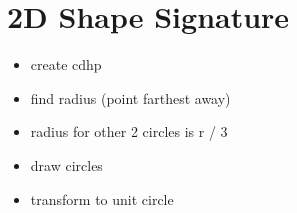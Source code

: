 \chapter{2D  Shape Signature}

\begin{itemize}
	\item create cdhp
	\item find radius (point farthest away)
	\item radius for other 2 circles is r / 3
	\item draw circles
	\item transform to unit circle
\end{itemize}